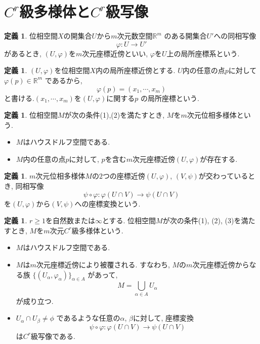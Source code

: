 \documentclass[a4j,12pt]{jarticle}
\theoremstyle{definition}
\newtheorem{definition}[theorem]{定義}
\begin{document}
\section{$C^r$級多様体と$C^r$級写像}
\begin{definition}
    位相空間$X$の開集合$U$から$m$次元数空間$\mathbb{R}^m$
    のある開集合$U'$への同相写像
    $$\varphi:U\rightarrow U'$$
    があるとき, $(U, \varphi)$を$m$次元座標近傍といい, 
    $\varphi$を$U$上の局所座標系という. 
\end{definition}
\begin{definition}
    $(U, \varphi)$を位相空間$X$内の局所座標近傍とする.
    $U$内の任意の点$p$に対して$\varphi(p) \in \mathbb{R}^m$
    であるから, 
    $$\varphi(p)=(x_1, \cdots ,x_m)$$
    と書ける.$(x_1, \cdots ,x_m)$を$(U, \varphi)$に関する$p$
    の局所座標という.
\end{definition}
\begin{definition}
    位相空間$M$が次の条件(1),(2)を満たすとき, 
    $M$を$m$次元位相多様体という. 
    \begin{itemize}
        \item[(1)]$M$はハウスドルフ空間である.
        \item[(2)]$M$内の任意の点$p$に対して, 
        $p$を含む$m$次元座標近傍$(U,\varphi)$が存在する.
    \end{itemize}
\end{definition}
\begin{definition}
    $m$次元位相多様体$M$の$2$つの座標近傍$(U, \varphi)$, 
    $(V, \psi)$が交わっているとき, 同相写像
    $$\psi \circ \varphi:\varphi(U\cap V)\rightarrow \psi(U\cap V)$$
    を$(U, \varphi)$から$(V, \psi)$への座標変換という. 
\end{definition}
\begin{definition}\label{def:C^r manifold}
    $r\geq 1$を自然数または$\infty$とする. 
    位相空間$M$が次の条件(1), (2), (3)を満たすとき, 
    $M$を$m$次元$C^r$級多様体という.
    \begin{itemize}
        \item[(1)]$M$はハウスドルフ空間である.
        \item[(2)]$M$は$m$次元座標近傍により被覆される. 
        すなわち, $M$の$m$次元座標近傍からなる族
        $\{(U_\alpha, \varphi_\alpha)\}_{\alpha \in A}$
        があって, 
        $$M = \bigcup_{\alpha \in A}U_\alpha$$
        が成り立つ. 
        \item[(3)]$U_\alpha \cap U_\beta \neq \phi$
        であるような任意の$\alpha$, $\beta$に対して, 座標変換
        $$\psi \circ \varphi:\varphi(U\cap V)\rightarrow \psi(U\cap V)$$
        は$C^r$級写像である. 
    \end{itemize}
\end{definition}
\end{document}
